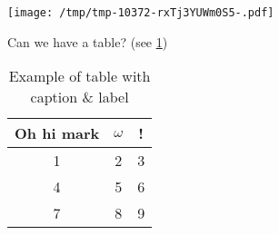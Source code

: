 \documentclass[12pt,russian,a4paper,,fleqn]{extarticle}
\newenvironment{Shaded}{}{}
\newcommand{\AttributeTok}[1]{\textcolor[rgb]{0.49,0.56,0.16}{#1}}
\newcommand{\ControlFlowTok}[1]{\textcolor[rgb]{0.00,0.44,0.13}{\textbf{#1}}}
\newcommand{\DecValTok}[1]{\textcolor[rgb]{0.25,0.63,0.44}{#1}}
\newcommand{\KeywordTok}[1]{\textcolor[rgb]{0.00,0.44,0.13}{\textbf{#1}}}
\newcommand{\NormalTok}[1]{#1}
\newcommand{\OperatorTok}[1]{\textcolor[rgb]{0.40,0.40,0.40}{#1}}
\newcommand{\SpecialCharTok}[1]{\textcolor[rgb]{0.25,0.44,0.63}{#1}}
\newcommand{\StringTok}[1]{\textcolor[rgb]{0.25,0.44,0.63}{#1}}
\let\origfigure=\figure
\let\endorigfigure=\endfigure
\renewenvironment{figure}[1][]{%
\origfigure[H]
}{%
\endorigfigure
}
\theoremstyle{definition}\newtheorem{definition}{Определение}
\theoremstyle{remark}\newtheorem*{remark}{Примечание}
\numberwithin{equation}{section}
\begin{document}
\begin{figure}
\hypertarget{fig:plot-example}{%
\centering
\texttt{[image: /tmp/tmp-10372-rxTj3YUWm0S5-.pdf]}
\caption{Example of plot with caption \& label}\label{fig:plot-example}
}
\end{figure}

Can we have a table? (see \ref{table:example-table})

\begin{Shaded}
\end{Shaded}

\begin{table}[ht]
\centering
\begin{tabular}[t]{|c|c|c|}
\hline
Oh hi mark & $\omega$ & !\\
\hline
1 & 2 & 3\\
\hline
4 & 5 & 6\\
\hline
7 & 8 & 9\\
\hline
\end{tabular}
\caption{
\label{table:example-table}
Example of table with caption \& label}
\end{table}
\end{document}
